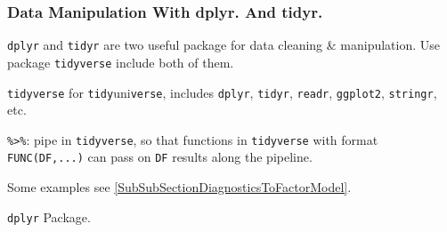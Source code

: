 \subsubsection{Data Manipulation With dplyr. And tidyr.}
    \lstinline|dplyr| and \lstinline|tidyr| are two useful package for data cleaning \& manipulation. Use package \lstinline|tidyverse| include both of them.

    \lstinline|tidyverse| for \lstinline|tidy|uni\lstinline|verse|, includes \lstinline|dplyr|, \lstinline|tidyr|, \lstinline|readr|, \lstinline|ggplot2|, \lstinline|stringr|, etc.

\begin{point}
    \lstinline|%>%|: pipe in \lstinline|tidyverse|, so that functions in \lstinline|tidyverse| with format \lstinline|FUNC(DF,...)| can pass on \lstinline|DF| results along the pipeline.
\end{point}

Some examples see \autoref{SubSubSectionDiagnosticsToFactorModel}.


\begin{point}
    \lstinline|dplyr| Package. 
\end{point}

